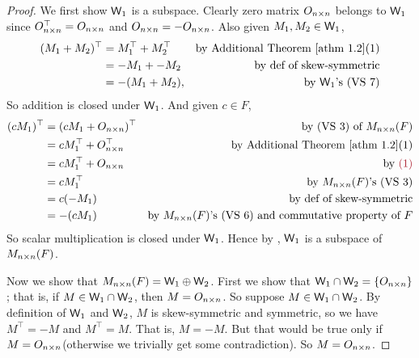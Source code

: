 \begin{proof}
We first show \(\textsf{W}_1\) is a subspace.
Clearly zero matrix \(O_{n \times n}\) belongs to \(\textsf{W}_1\) since \(O^\top_{n \times n} = O_{n \times n}\)  and \(O_{n \times n} = -O_{n \times n}\).
Also given \(M_1, M_2 \in \textsf{W}_1\),
\begin{align*}
    (M_1 + M_2)^\top & = M_1^\top + M_2^\top & \text{by \ATHM{1.2}(1)} \\
                  & = -M_1 + -M_2 & \text{by def of skew-symmetric} \\
                  & = -(M_1 + M_2), & \text{by \(\W_1\)'s (VS 7)}
\end{align*}
So addition is closed under \(\textsf{W}_1\).
And given \(c \in F\),
\begin{align*}
    (cM_1)^\top & = (cM_1 + O_{n \X n})^\top & \text{by (VS 3) of \(M_{n \X n}(F)\)} \\
             & = cM_1^\top + O_{n \X n}^\top & \text{by \ATHM{1.2}(1)} \\
             & = cM_1^\top + O_{n \X n} & \text{by \MAROON{(1)}} \\
             & = cM_1^\top & \text{by \(M_{n \X n}(F)\)'s (VS 3)} \\
             & = c(-M_1) & \text{by def of skew-symmetric} \\
             & = -(cM_1) & \text{by \(M_{n \X n}(F)\)'s (VS 6) and commutative property of \(F\)}
\end{align*}
So scalar multiplication is closed under \(\textsf{W}_1\).
Hence by , \(\textsf{W}_1\) is a subspace of \(M_{n \times n}(F)\).

Now we show that \(M_{n \times n}(F) = \textsf{W}_1 \oplus \textsf{W}_2\).
First we show that \(\textsf{W}_1 \cap \textsf{W}_2 = \{ O_{n \times n} \}\);
that is, if \(M \in \textsf{W}_1 \cap \textsf{W}_2\), then \(M = O_{n \times n}\).
So suppose \(M \in \textsf{W}_1 \cap \textsf{W}_2\).
By definition of \(\textsf{W}_1\) and \(\textsf{W}_2\), \(M\) is skew-symmetric and symmetric, so we have \(M^\top = -M\) and \(M^\top = M\).
That is, \(M = -M\).
But that would be true only if \(M = O_{n \times n}\)(otherwise we trivially get some contradiction).
So \(M = O_{n \times n}\).


\end{proof}
